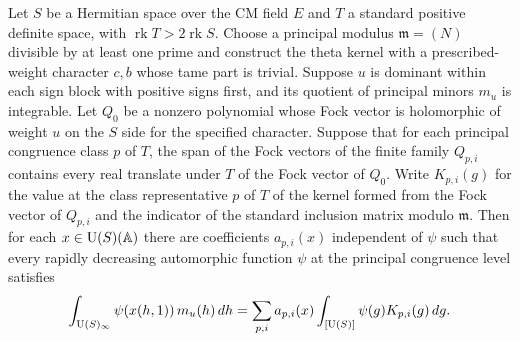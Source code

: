 \begin{lemma}
\label{lem:c-theta-kernel-reproduction}
\emitthmsource
Let $S$ be a Hermitian space over the CM field $E$ and $T$ a standard positive definite space, with $\operatorname{rk}T>2\operatorname{rk}S$. Choose a principal modulus $\mathfrak m=(N)$ divisible by at least one prime and construct the theta kernel with a prescribed-weight character $c,b$ whose tame part is trivial. Suppose $u$ is dominant within each sign block with positive signs first, and its quotient of principal minors $m_u$ is integrable. Let $Q_0$ be a nonzero polynomial whose Fock vector is holomorphic of weight $u$ on the $S$ side for the specified character. Suppose that for each principal congruence class $p$ of $T$, the span of the Fock vectors of the finite family $Q_{p,i}$ contains every real translate under $T$ of the Fock vector of $Q_0$. Write $K_{p,i}(g)$ for the value at the class representative $p$ of $T$ of the kernel formed from the Fock vector of $Q_{p,i}$ and the indicator of the standard inclusion matrix modulo $\mathfrak m$. Then for each $x\in \operatorname{U}(S)(\mathbb A)$ there are coefficients $a_{p,i}(x)$ independent of $\psi$ such that every rapidly decreasing automorphic function $\psi$ at the principal congruence level satisfies
\[
 \int_{\operatorname{U}(S)_\infty}\psi(x(h,1))\,m_u(h)\,dh
 =\sum_{p,i}a_{p,i}(x)\int_{[\operatorname{U}(S)]}\psi(g)K_{p,i}(g)\,dg .
\]
\end{lemma}

